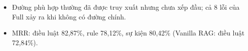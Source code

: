 \begin{frame}
\vspace{0.08cm}
\footnotesize
\begin{itemize}
  \item Đường phù hợp thường đã được truy xuất nhưng chưa xếp đầu; cả 8 lỗi của Full xảy ra khi không có đường chính.
  \item MRR: điều luật 82,87\%, rule 78,12\%, sự kiện 80,42\% (Vanilla RAG: điều luật 72,84\%).
\end{itemize}

\vspace{0.06cm}
\end{frame}

